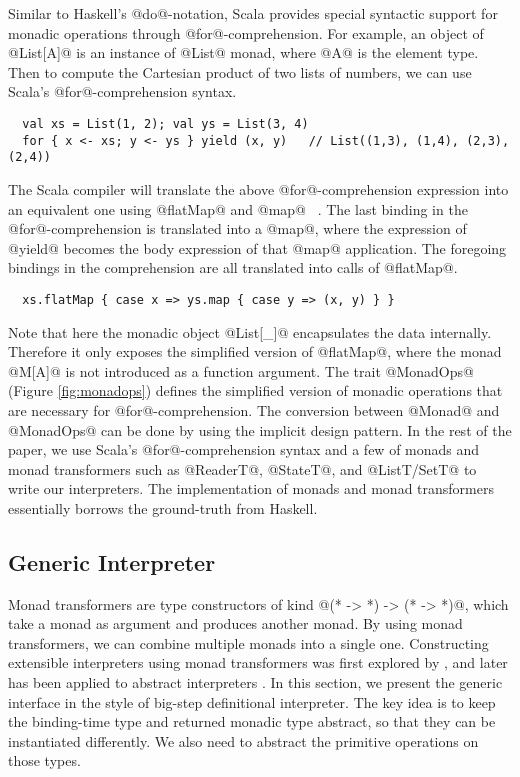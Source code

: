 Similar to Haskell's @do@-notation, Scala provides special syntactic support for
monadic operations through @for@-comprehension.
For example, an object of @List[A]@ is an instance of @List@ monad, where @A@ is the element type. 
Then to compute the Cartesian product of two lists of numbers, we can use Scala's
@for@-comprehension syntax.
\begin{lstlisting}
  val xs = List(1, 2); val ys = List(3, 4)
  for { x <- xs; y <- ys } yield (x, y)   // List((1,3), (1,4), (2,3), (2,4))
\end{lstlisting}

The Scala compiler will translate the above @for@-comprehension expression into
an equivalent one using @flatMap@ and @map@ ~\cite{scala_spec}. The last binding
in the @for@-comprehension is translated into a @map@, where the expression of
@yield@ becomes the body expression of that @map@ application. The foregoing
bindings in the comprehension are all translated into calls of @flatMap@.
\begin{lstlisting}
  xs.flatMap { case x => ys.map { case y => (x, y) } }
\end{lstlisting}

Note that here the monadic object @List[_]@ encapsulates the data
internally.  Therefore it only exposes the simplified version of
@flatMap@, where the monad @M[A]@ is not introduced as a function
argument. The trait @MonadOps@ (Figure \ref{fig:monadops}) defines the
simplified version of monadic operations that are necessary for
@for@-comprehension. The conversion between @Monad@ and @MonadOps@
can be done by using the implicit design pattern.
In the rest of the paper, we use Scala's @for@-comprehension syntax
and a few of monads and monad transformers such as @ReaderT@,
@StateT@, and @ListT/SetT@ to write our interpreters. The implementation
of monads and monad transformers essentially borrows the ground-truth
from Haskell.

\subsection{Generic Interpreter} \label{generic_if}

Monad transformers are type constructors of kind @(* -> *) -> (* -> *)@, which
take a monad as argument and produces another monad. By using monad
transformers, we can combine multiple monads into a single one. Constructing
extensible interpreters using monad transformers was first explored by
\citet{DBLP:conf/popl/LiangHJ95}, and later has been applied to abstract
interpreters \cite{Sergey:2013:MAI:2491956.2491979,
  DBLP:journals/pacmpl/DaraisLNH17, Darais:2015:GTM:2814270.2814308}.
In this section, we present the generic interface in the style of big-step
definitional interpreter. The key idea is to keep the binding-time type and
returned monadic type abstract, so that they can be instantiated differently.
We also need to abstract the primitive operations on those types.

